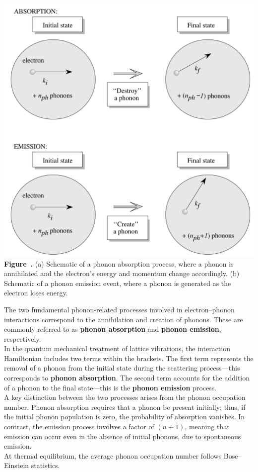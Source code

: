 \begin{center}
	\begin{minipage}{0.9\textwidth}
		\centering
		\includegraphics[width=\textwidth]{img/absandemission_phonon.png}
		\\[0.5em]
		\textbf{Figure~\thefigure.} (a) Schematic of a phonon absorption process, where a phonon is annihilated and the electron's energy and momentum change accordingly. (b) Schematic of a phonon emission event, where a phonon is generated as the electron loses energy.
		\label{fig:absandemission_phonon}
	\end{minipage}
\end{center}

The two fundamental phonon-related processes involved in electron–phonon interactions correspond to the annihilation and creation of phonons. These are commonly referred to as \textbf{phonon absorption} and \textbf{phonon emission}, respectively.\\
In the quantum mechanical treatment of lattice vibrations, the interaction Hamiltonian includes two terms within the brackets. The first term represents the removal of a phonon from the initial state during the scattering process—this corresponds to \textbf{phonon absorption}. The second term accounts for the addition of a phonon to the final state—this is the \textbf{phonon emission} process.\\
A key distinction between the two processes arises from the phonon occupation number. Phonon absorption requires that a phonon be present initially; thus, if the initial phonon population is zero, the probability of absorption vanishes. In contrast, the emission process involves a factor of $(n + 1)$, meaning that emission can occur even in the absence of initial phonons, due to spontaneous emission.\\
At thermal equilibrium, the average phonon occupation number follows Bose–Einstein statistics.